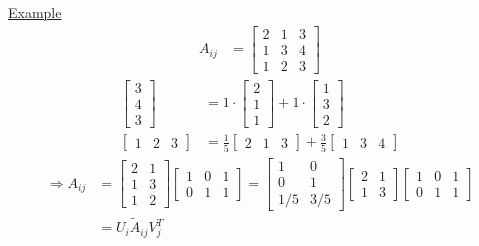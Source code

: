 \underline{Example}
\begin{align*}
    A_{ij} &=
    \begin{bmatrix}
        2 & 1 & 3 \\
        1 & 3 & 4 \\
        1 & 2 & 3
    \end{bmatrix}
\end{align*}
\begin{align*}
    \begin{bmatrix}
        3 \\
        4 \\
        3
    \end{bmatrix}
    &= 1\cdot
    \begin{bmatrix}
        2 \\
        1 \\
        1
    \end{bmatrix}
    + 1 \cdot
    \begin{bmatrix}
        1 \\
        3 \\
        2
    \end{bmatrix}
    \\
    \begin{bmatrix}
        1 & 2 & 3
    \end{bmatrix}
    &=
    \frac{1}{5}
    \begin{bmatrix}
        2 & 1 & 3
    \end{bmatrix}
    +
    \frac{3}{5}
    \begin{bmatrix}
        1 & 3 & 4
    \end{bmatrix}
\end{align*}
\begin{align*}
    \Rightarrow A_{ij} &=
    \begin{bmatrix}
        2 & 1 \\
        1 & 3 \\
        1 & 2
    \end{bmatrix}
    \begin{bmatrix}
        1 & 0 & 1 \\
        0 & 1 & 1
    \end{bmatrix}
    =
    \begin{bmatrix}
        1 & 0 \\
        0 & 1 \\
        1/5 & 3/5
    \end{bmatrix}
    \begin{bmatrix}
        2 & 1 \\
        1 & 3
    \end{bmatrix}
    \begin{bmatrix}
        1 & 0 & 1 \\
        0 & 1 & 1
    \end{bmatrix}\\
    &= U_i \widetilde{A}_{ij} V^T_j
\end{align*}

